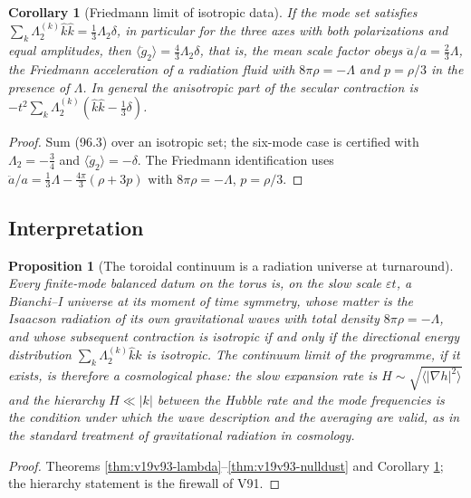 \documentclass[11pt]{article}
\newtheorem{proposition}[theorem]{Proposition}
\newtheorem{corollary}[theorem]{Corollary}
\theoremstyle{remark}
\begin{document}
\begin{corollary}[Friedmann limit of isotropic data]
\label{cor:v19v93-friedmann}
If the mode set satisfies \(\sum_k\Lambda_2^{(k)}\hat k\hat k=\tfrac13\Lambda_2\delta\),
in particular for the three axes with both polarizations and equal
amplitudes, then \(\langle\ddot g_2\rangle=\tfrac43\Lambda_2\delta\),
that is, the mean scale factor obeys \(\ddot a/a=\tfrac23\Lambda\),
the Friedmann acceleration of a radiation fluid with
\(8\pi\rho=-\Lambda\) and \(p=\rho/3\) in the presence of \(\Lambda\).
In general the anisotropic part of the secular contraction is
\(-t^2\sum_k\Lambda_2^{(k)}(\hat k\hat k-\tfrac13\delta)\).
\end{corollary}

\begin{proof}
Sum (96.3) over an isotropic set; the six-mode case is certified with
\(\Lambda_2=-\tfrac34\) and \(\langle\ddot g_2\rangle=-\delta\).  The
Friedmann identification uses
\(\ddot a/a=\tfrac13\Lambda-\tfrac{4\pi}3(\rho+3p)\) with \(8\pi\rho=-\Lambda\), \(p=\rho/3\).
\end{proof}

\subsection{Interpretation}

\begin{proposition}[The toroidal continuum is a radiation universe at turnaround]
\label{prop:v19v93-interpretation}
Every finite-mode balanced datum on the torus is, on the slow scale
\(\varepsilon t\), a Bianchi--I universe at its moment of time
symmetry, whose matter is the Isaacson radiation of its own
gravitational waves with total density \(8\pi\rho=-\Lambda\), and
whose subsequent contraction is isotropic if and only if the
directional energy distribution \(\sum_k\Lambda_2^{(k)}\hat k\hat k\)
is isotropic.  The continuum limit of the programme, if it exists, is
therefore a cosmological phase: the slow expansion rate is
\(H\sim\sqrt{\langle|\nabla h|^2\rangle}\) and the hierarchy
\(H\ll|k|\) between the Hubble rate and the mode frequencies is the
condition under which the wave description and the averaging are
valid, as in the standard treatment of gravitational radiation in
cosmology.
\end{proposition}

\begin{proof}
Theorems \ref{thm:v19v93-lambda}--\ref{thm:v19v93-nulldust} and
Corollary \ref{cor:v19v93-friedmann}; the hierarchy statement is the
firewall of V91.
\end{proof}
\end{document}
